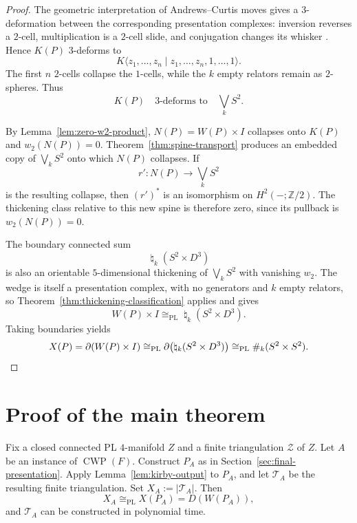 \documentclass[a4paper,11pt,reqno]{amsart}
\theoremstyle{definition}
\theoremstyle{remark}
\DeclareMathOperator{\CWP}{CWP}
\newcommand{\PL}{\mathrm{PL}}
\newcommand{\wedgek}[1]{\bigvee_{#1} S^2}
\newcommand{\cs}{\mathbin{\#}}
\newcommand{\bs}{\mathbin{\natural}}
\begin{document}
	\begin{proof}
		The geometric interpretation of Andrews--Curtis moves gives a
		$3$-deformation between the corresponding presentation complexes:
		inversion reverses a $2$-cell, multiplication is a $2$-cell slide, and
		conjugation changes its whisker
		\cite{AndrewsCurtis,Cohen,HogAngeloniMetzler}. Hence $K(P)$
		$3$-deforms to
		\[
		K\langle z_1,\dots,z_n\mid z_1,\dots,z_n,1,\dots,1\rangle .
		\]
		The first $n$ $2$-cells collapse the $1$-cells, while the $k$ empty
		relators remain as $2$-spheres. Thus
		\[
		K(P)\quad 3\text{-deforms to}\quad \wedgek{k}.
		\]
		
		By Lemma~\ref{lem:zero-w2-product}, $N(P)=W(P)\times I$ collapses onto
		$K(P)$ and $w_2(N(P))=0$. Theorem~\ref{thm:spine-transport} produces an
		embedded copy of $\wedgek{k}$ onto which $N(P)$ collapses. If
		\[
		r'\colon N(P)\longrightarrow\wedgek{k}
		\]
		is the resulting collapse, then $(r')^*$ is an isomorphism on
		$H^2(-;\mathbb Z/2)$. The thickening class relative to this new spine is
		therefore zero, since its pullback is $w_2(N(P))=0$.
		
		The boundary connected sum
		\[
		\bs_k(S^2\times D^3)
		\]
		is also an orientable $5$-dimensional thickening of $\wedgek{k}$ with vanishing $w_2$.
		The wedge is itself a presentation complex, with no generators and $k$
		empty relators, so Theorem~\ref{thm:thickening-classification} applies and
		gives
		\[
		W(P)\times I\cong_{\PL}\bs_k(S^2\times D^3).
		\]
		Taking boundaries yields
		\[
		X(P)=\partial(W(P)\times I)
		\cong_{\PL}
		\partial\bigl(\bs_k(S^2\times D^3)\bigr)
		\cong_{\PL}
		\cs_k(S^2\times S^2).\qedhere
		\]
	\end{proof}
	
	\section{Proof of the main theorem}
	\label{sec:proof-of-theorem}
	
	Fix a closed connected PL $4$-manifold $Z$ and a finite
	triangulation $\mathcal Z$ of $Z$. Let $A$ be an instance of
	$\CWP(F)$. Construct $P_A$ as in
	Section~\ref{sec:final-presentation}. Apply
	Lemma~\ref{lem:kirby-output} to $P_A$, and let $\mathcal T_A$ be the
	resulting finite triangulation. Set
	\(
	X_A:=|\mathcal T_A|.
	\)
	Then
	\[
	X_A\cong_{\PL}X(P_A)=D(W(P_A)),
	\]
	and $\mathcal T_A$ can be constructed in polynomial time.
	
\end{document}
